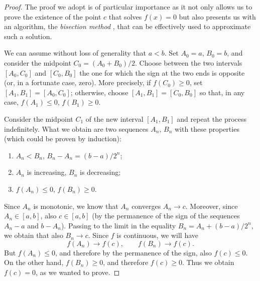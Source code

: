 \begin{proof}
\mymark{***}
The proof we adopt is of particular importance as
it not only allows us to prove the existence of the point $c$ that solves
$f(x)=0$
but also presents us with
an algorithm, the \emph{bisection method}%
%
,
that can be effectively used to approximate
such a solution.

We can assume without loss of generality that $a<b$.
Set $A_0 = a$, $B_0= b$, and consider the midpoint $C_0 = (A_0+B_0)/2$.
Choose between the two intervals $[A_0, C_0]$ and $[C_0,B_0]$ the one for which
the sign at the two ends is opposite (or, in a fortunate case, zero).
More precisely, if $f(C_0)\ge 0$, set $[A_1,B_1] = [A_0,C_0]$; otherwise,
choose $[A_1,B_1] = [C_0,B_0]$ so that, in any case,
$f(A_1)\le 0$, $f(B_1)\ge 0$.

Consider the midpoint $C_1$ of the new interval $[A_1,B_1]$ and repeat
the process indefinitely. What we obtain are two sequences
$A_n$, $B_n$ with these properties (which could be proven by induction):
\begin{enumerate}
\item $A_n < B_n$, $B_n - A_n = (b-a)/2^n$;
\item $A_n$ is increasing, $B_n$ is decreasing;
\item $f(A_n)\le 0$, $f(B_n)\ge 0$.
\end{enumerate}

Since $A_n$ is monotonic, we know that $A_n$ converges $A_n\to c$.
Moreover, since $A_n \in [a,b]$, also $c\in [a,b]$ (by the permanence of
the sign of the sequences $A_n-a$ and $b-A_n$).
Passing to the limit in the equality $B_n = A_n + (b-a)/2^n$,
we obtain that also $B_n \to c$. Since $f$ is continuous,
we will have
\[
f(A_n) \to f(c), \qquad
f(B_n) \to f(c).
\]
But $f(A_n)\le 0$, and therefore by the permanence of the sign, also $f(c)\le
0$.
On the other hand, $f(B_n) \ge 0$, and therefore $f(c)\ge 0$.
Thus we obtain $f(c) = 0$, as we wanted to prove.
\end{proof}

